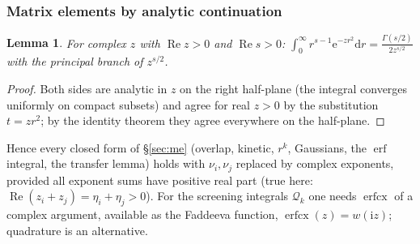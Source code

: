 \documentclass[11pt,a4paper]{article}
\numberwithin{equation}{section}
\theoremstyle{definition}
\theoremstyle{plain}
\newtheorem{lemma}[definition]{Lemma}
\theoremstyle{remark}
\numberwithin{algorithm}{section}
\newcommand{\dd}{\mathrm{d}}
\newcommand{\ii}{\mathrm{i}}
\newcommand{\ee}{\mathrm{e}}
\newcommand{\erf}{\operatorname{erf}}
\newcommand{\erfcx}{\operatorname{erfcx}}
\begin{document}
\subsubsection{Matrix elements by analytic continuation}
\begin{lemma}
For complex $z$ with $\operatorname{Re}z>0$ and $\operatorname{Re}s>0$: $\displaystyle\int_0^\infty r^{s-1}\ee^{-zr^2}\dd r=\frac{\Gamma(s/2)}{2z^{s/2}}$ with the principal branch of $z^{s/2}$.
\end{lemma}
\begin{proof}
Both sides are analytic in $z$ on the right half-plane (the integral converges uniformly on compact subsets) and agree for real $z>0$ by the substitution $t=zr^2$; by the identity theorem they agree everywhere on the half-plane.
\end{proof}
Hence every closed form of \S\ref{sec:me} (overlap, kinetic, $r^k$, Gaussians, the $\erf$ integral, the transfer lemma) holds with $\nu_i,\nu_j$ replaced by complex exponents, provided all exponent sums have positive real part (true here: $\operatorname{Re}(z_i+z_j)=\eta_i+\eta_j>0$). For the screening integrals $\mathcal Q_k$ one needs $\erfcx$ of a complex argument, available as the Faddeeva function, $\erfcx(z)=w(\ii z)$; quadrature is an alternative.
\end{document}
